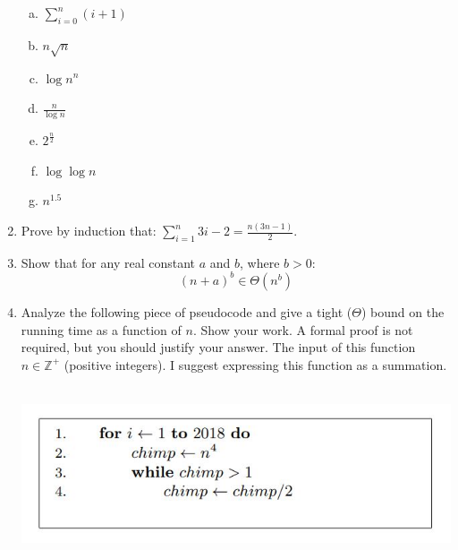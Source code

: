 \documentclass[12pt]{article}
\begin{document}
\begin{enumerate}
\begin{enumerate}[a)]
\item $\sum\limits_{i = 0}^{n} (i + 1)$\\
\item $n\sqrt{n}$\\
\item $\log{n^n}$\\
\item $\frac{n}{\log{n}}$\\
\item  $2^{\frac{n}{2}}$\\
\item  $\log{\log{n}}$\\
\item  $n^{1.5}$\\
\end{enumerate}
\newpage
\item Prove by induction that: $\sum\limits_{i=1}^{n}{3i-2}=\frac{n(3n-1)}{2}$.
\newpage
\item Show that for any real constant $a$ and $b$, where $b>0$:
$$(n+a)^b\in\Theta(n^b)$$
\newpage
\item Analyze the following piece of pseudocode and give a tight ($\Theta$) bound 
on the running time as a function of $n$. Show your work. A formal proof is not required, 
but you should justify your answer. The input of this function $n\in\mathbb{Z^+}$ (positive integers).
I suggest expressing this function as a summation. \\\\
\centerline{\includegraphics[scale = 0.6]{chimp.JPG}}
\end{enumerate}
\end{document}
